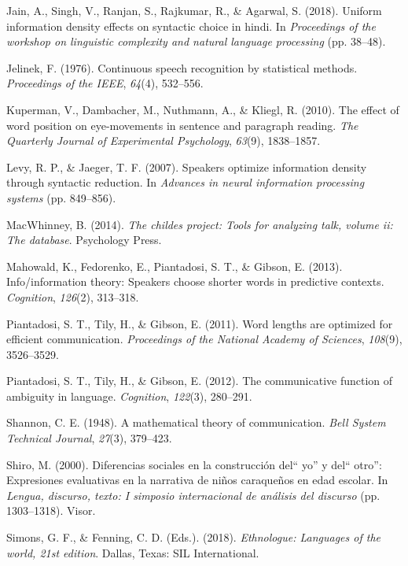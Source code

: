 \documentclass[10pt, letterpaper]{article}
\begin{document}
\hypertarget{ref-jain2018}{}
Jain, A., Singh, V., Ranjan, S., Rajkumar, R., \& Agarwal, S. (2018).
Uniform information density effects on syntactic choice in hindi. In
\emph{Proceedings of the workshop on linguistic complexity and natural
language processing} (pp. 38--48).

\hypertarget{ref-jelinek1976}{}
Jelinek, F. (1976). Continuous speech recognition by statistical
methods. \emph{Proceedings of the IEEE}, \emph{64}(4), 532--556.

\hypertarget{ref-kuperman2010}{}
Kuperman, V., Dambacher, M., Nuthmann, A., \& Kliegl, R. (2010). The
effect of word position on eye-movements in sentence and paragraph
reading. \emph{The Quarterly Journal of Experimental Psychology},
\emph{63}(9), 1838--1857.

\hypertarget{ref-levy2007}{}
Levy, R. P., \& Jaeger, T. F. (2007). Speakers optimize information
density through syntactic reduction. In \emph{Advances in neural
information processing systems} (pp. 849--856).

\hypertarget{ref-macwhinney2014}{}
MacWhinney, B. (2014). \emph{The childes project: Tools for analyzing
talk, volume ii: The database}. Psychology Press.

\hypertarget{ref-mahowald2013}{}
Mahowald, K., Fedorenko, E., Piantadosi, S. T., \& Gibson, E. (2013).
Info/information theory: Speakers choose shorter words in predictive
contexts. \emph{Cognition}, \emph{126}(2), 313--318.

\hypertarget{ref-piantadosi2011}{}
Piantadosi, S. T., Tily, H., \& Gibson, E. (2011). Word lengths are
optimized for efficient communication. \emph{Proceedings of the National
Academy of Sciences}, \emph{108}(9), 3526--3529.

\hypertarget{ref-piantadosi2012}{}
Piantadosi, S. T., Tily, H., \& Gibson, E. (2012). The communicative
function of ambiguity in language. \emph{Cognition}, \emph{122}(3),
280--291.

\hypertarget{ref-shannon1948}{}
Shannon, C. E. (1948). A mathematical theory of communication.
\emph{Bell System Technical Journal}, \emph{27}(3), 379--423.

\hypertarget{ref-shiro2000}{}
Shiro, M. (2000). Diferencias sociales en la construcción del`` yo'' y
del`` otro'': Expresiones evaluativas en la narrativa de niños
caraqueños en edad escolar. In \emph{Lengua, discurso, texto: I simposio
internacional de análisis del discurso} (pp. 1303--1318). Visor.

\hypertarget{ref-simons2018}{}
Simons, G. F., \& Fenning, C. D. (Eds.). (2018). \emph{Ethnologue:
Languages of the world, 21st edition}. Dallas, Texas: SIL International.
\end{document}
